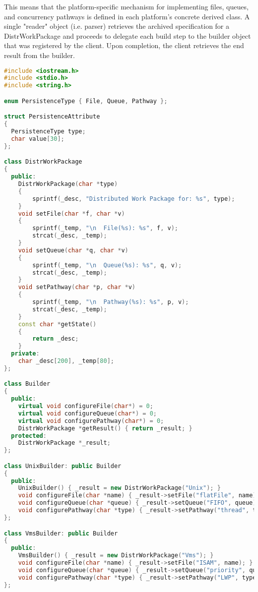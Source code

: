 \documentclass{book}
\begin{document}
This means that the platform-specific mechanism for implementing files, queues, and concurrency pathways is defined in each platform's concrete derived class.
A single "reader" object (i.e. parser) retrieves the archived specification for a DistrWorkPackage and proceeds to delegate each build step to the builder object that was registered by the client.
Upon completion, the client retrieves the end result from the builder.

\begin{lstlisting}[caption={Builder Patterns sample code 1}, language=C++]
#include <iostream.h>
#include <stdio.h>
#include <string.h>

enum PersistenceType { File, Queue, Pathway };

struct PersistenceAttribute
{
  PersistenceType type;
  char value[30];
};

class DistrWorkPackage
{
  public:
    DistrWorkPackage(char *type)
    {
        sprintf(_desc, "Distributed Work Package for: %s", type);
    }
    void setFile(char *f, char *v)
    {
        sprintf(_temp, "\n  File(%s): %s", f, v);
        strcat(_desc, _temp);
    }
    void setQueue(char *q, char *v)
    {
        sprintf(_temp, "\n  Queue(%s): %s", q, v);
        strcat(_desc, _temp);
    }
    void setPathway(char *p, char *v)
    {
        sprintf(_temp, "\n  Pathway(%s): %s", p, v);
        strcat(_desc, _temp);
    }
    const char *getState()
    {
        return _desc;
    }
  private:
    char _desc[200], _temp[80];
};

class Builder
{
  public:
    virtual void configureFile(char*) = 0;
    virtual void configureQueue(char*) = 0;
    virtual void configurePathway(char*) = 0;
    DistrWorkPackage *getResult() { return _result; }
  protected:
    DistrWorkPackage *_result;
};

class UnixBuilder: public Builder
{
  public:
    UnixBuilder() { _result = new DistrWorkPackage("Unix"); }
    void configureFile(char *name) { _result->setFile("flatFile", name); }
    void configureQueue(char *queue) { _result->setQueue("FIFO", queue); }
    void configurePathway(char *type) { _result->setPathway("thread", type); }
};

class VmsBuilder: public Builder
{
  public:
    VmsBuilder() { _result = new DistrWorkPackage("Vms"); }
    void configureFile(char *name) { _result->setFile("ISAM", name); }
    void configureQueue(char *queue) { _result->setQueue("priority", queue); }
    void configurePathway(char *type) { _result->setPathway("LWP", type); }
};


\end{lstlisting}
\end{document}
